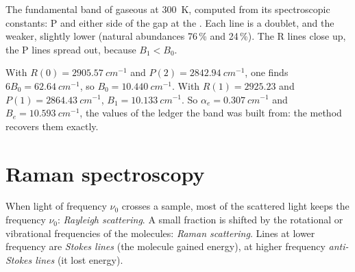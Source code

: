 \begin{omfigure}

{\small The fundamental band of gaseous  at \qty{300}{K}, computed from
its spectroscopic constants: P and  either side of the gap at the
. Each line is a doublet,  and the weaker, slightly
lower  (natural abundances 76\,\% and 24\,\%). The R lines close up,
the P lines spread out, because $B_1 < B_0$.}
\end{omfigure}

\begin{example}\label{ex:b3:rovibrational-spectroscopy:analysis}
With $R(0) = \qty{2905.57}{cm^{-1}}$ and $P(2) = \qty{2842.94}{cm^{-1}}$, one finds
$6B_0 = \qty{62.64}{cm^{-1}}$, so $B_0 = \qty{10.440}{cm^{-1}}$. With $R(1) = 2925.23$ and $P(1) =
\qty{2864.43}{cm^{-1}}$, $B_1 = \qty{10.133}{cm^{-1}}$. So $\alpha_e = \qty{0.307}{cm^{-1}}$
and $B_e = \qty{10.593}{cm^{-1}}$, the values of the ledger the band was built from:
the method recovers them exactly.
\end{example}

\section{Raman spectroscopy}

\begin{definition}\label{def:b3:rovibrational-spectroscopy:raman}
When light of frequency $\nu_0$ crosses a sample, most of the scattered light
keeps the frequency $\nu_0$: \emph{Rayleigh scattering}. A small fraction is shifted by the rotational or vibrational
frequencies of the molecules: \emph{Raman scattering}.
Lines at lower frequency are \emph{Stokes lines} (the
molecule gained energy), at higher frequency \emph{anti-Stokes
lines} (it lost energy).
\end{definition}

